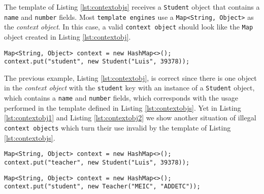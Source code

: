 \noindent
The template of Listing \ref{lst:contextobjs} receives a \texttt{Student} object that contains a \texttt{name} and \texttt{number} fields. Most \texttt{template engines} use a \texttt{Map<String, Object>} as the \textit{context object}. In this case, a valid \texttt{context object} should look like the \texttt{Map} object created in Listing \ref{lst:contextobj}.

\bigskip


\begin{minipage}{\linewidth}
\begin{lstlisting}[caption={Template Engine with a valid Context Object}, label={lst:contextobj}]
Map<String, Object> context = new HashMap<>();
context.put("student", new Student("Luis", 39378));
\end{lstlisting}
\end{minipage} 

\noindent
The previous example, Listing \ref{lst:contextobj}, is correct since there is one object in the \textit{context object} with the \texttt{student} key with an instance of a \texttt{Student} object, which contains a \texttt{name} and \texttt{number} fields, which corresponds with the usage performed in the template defined in Listing \ref{lst:contextobjs}. Yet in Listing \ref{lst:contextobj1} and Listing \ref{lst:contextobj2} we show another situation of illegal \texttt{context objects} which turn their use invalid by the template of Listing \ref{lst:contextobjs}.

\bigskip


\begin{minipage}{\linewidth}
\begin{lstlisting}[caption={Template Engine with a Context Object with a wrong key}, label={lst:contextobj1}]
Map<String, Object> context = new HashMap<>();
context.put("teacher", new Student("Luis", 39378));
\end{lstlisting}
\end{minipage} 

\bigskip


\begin{minipage}{\linewidth}
\begin{lstlisting}[caption={Template Engine with a Context Object with a wrong type}, label={lst:contextobj2}]
Map<String, Object> context = new HashMap<>();
context.put("student", new Teacher("MEIC", "ADDETC"));
\end{lstlisting}
\end{minipage} 

